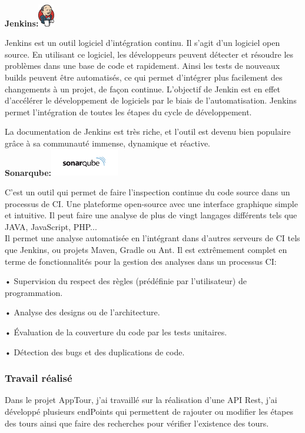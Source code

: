 \documentclass[12pt]{article}
\begin{document}
\textbf{Jenkins:}\includegraphics[width=7mm,scale=0.5]{diagrammes/jenkins.png}

Jenkins est un outil logiciel d’intégration continu. Il s’agit d’un logiciel open source. En utilisant ce logiciel, les développeurs peuvent détecter et résoudre les problèmes dans une base de code et rapidement. Ainsi les tests de nouveaux builds peuvent être automatisés, ce qui permet d’intégrer plus facilement des changements à un projet, de façon continue. L’objectif de Jenkin est en effet d’accélérer le développement de logiciels par le biais de l’automatisation. Jenkins permet l’intégration de toutes les étapes du cycle de développement.


La documentation de Jenkins est très riche, et l’outil est devenu bien populaire grâce à sa communauté immense, dynamique et réactive.\\
\textbf{Sonarqube:}\includegraphics[width=30mm,scale=0.5]{diagrammes/sonarqube.png}

C’est un outil qui permet de faire l’inspection continue du code source dans un processus de CI. Une plateforme open-source avec une interface graphique simple et intuitive. Il peut faire une analyse de plus de vingt langages différents tels que JAVA, JavaScript, PHP...\\
Il permet une analyse automatisée en l’intégrant dans d’autres serveurs de CI tels que Jenkins, ou projets Maven, Gradle ou Ant. Il est extrêmement complet en terme de fonctionnalités pour la gestion des analyses dans un processus CI:

• Supervision du respect des règles (prédéfinie par l’utilisateur) de programmation.

• Analyse des designs ou de l’architecture.

• Évaluation de la couverture du code par les tests unitaires.

• Détection des bugs et des duplications de code.
 
\subsubsection{Travail réalisé}

Dans le projet AppTour, j'ai travaillé sur la réalisation d'une API Rest, j'ai développé plusieurs endPoints qui permettent de rajouter ou modifier les étapes des tours ainsi que faire des recherches pour vérifier l’existence des tours. 
\end{document}
